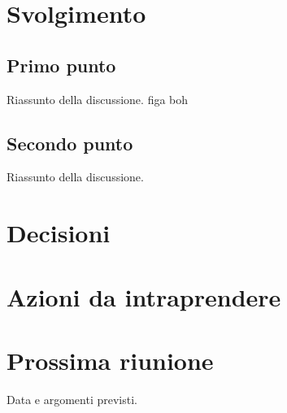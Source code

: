 \section{Svolgimento}
\subsection{Primo punto}
Riassunto della discussione.  figa boh

\subsection{Secondo punto}
Riassunto della discussione.

\section{Decisioni}
\begin{decisioni}
\end{decisioni}

\section{Azioni da intraprendere}
\begin{azioni}
\end{azioni}

\section{Prossima riunione}
Data e argomenti previsti.


